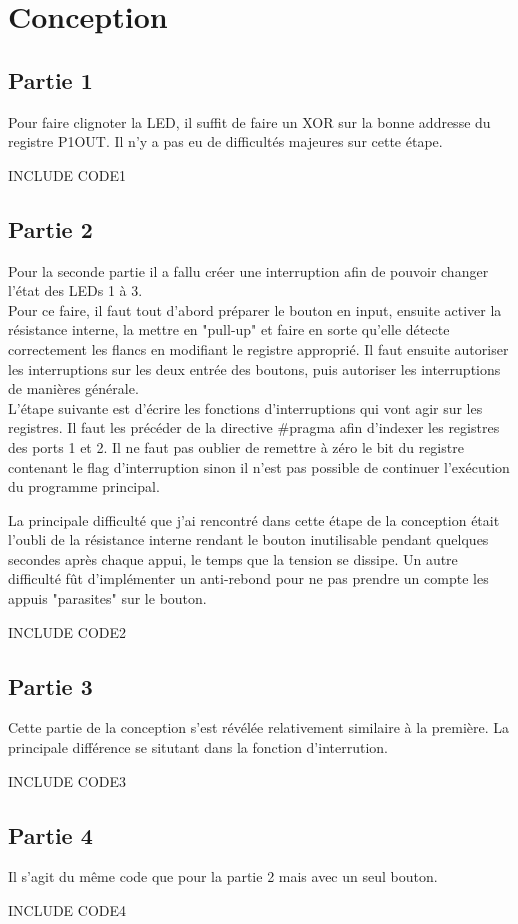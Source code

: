 \section{Conception}
\subsection{Partie 1}
Pour faire clignoter la LED, il suffit de faire un XOR sur la bonne addresse du registre P1OUT. Il n'y a pas eu de difficultés majeures sur cette étape.

INCLUDE CODE1

\subsection{Partie 2}
Pour la seconde partie il a fallu créer une interruption afin de pouvoir changer l'état des LEDs 1 à 3.\\
Pour ce faire, il faut tout d'abord préparer le bouton en input, ensuite activer la résistance interne, la mettre en "pull-up" et faire en sorte qu'elle détecte correctement les flancs en modifiant le registre approprié.
Il faut ensuite autoriser les interruptions sur les deux entrée des boutons, puis autoriser les interruptions de manières générale.\\
L'étape suivante est d'écrire les fonctions d'interruptions qui vont agir sur les registres. Il faut les précéder de la directive \#pragma afin d'indexer les registres des ports 1 et 2.
Il ne faut pas oublier de remettre à zéro le bit du registre contenant le flag d'interruption sinon il n'est pas possible de continuer l'exécution du programme principal.

La principale difficulté que j'ai rencontré dans cette étape de la conception était l'oubli de la résistance interne rendant le bouton inutilisable pendant quelques secondes après chaque appui, le temps que la tension se dissipe.
Un autre difficulté fût d'implémenter un anti-rebond pour ne pas prendre un compte les appuis "parasites" sur le bouton.

INCLUDE CODE2

\subsection{Partie 3}
Cette partie de la conception s'est révélée relativement similaire à la première. La principale différence se situtant dans la fonction d'interrution.

INCLUDE CODE3

\subsection{Partie 4}
Il s'agit du même code que pour la partie 2 mais avec un seul bouton.

INCLUDE CODE4
